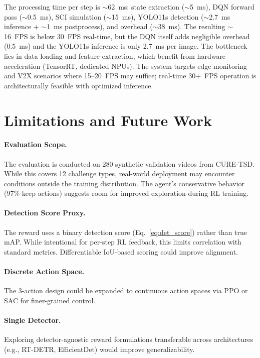 \documentclass[10pt,journal]{IEEEtran}
\begin{document}
The processing time per step is ${\sim}$62~ms: state extraction (${\sim}$5~ms), DQN forward pass (${\sim}$0.5~ms), SCI simulation (${\sim}$15~ms), YOLO11s detection (${\sim}$2.7~ms inference + ${\sim}$1~ms postprocess), and overhead (${\sim}$38~ms). The resulting ${\sim}$16~FPS is below 30~FPS real-time, but the DQN itself adds negligible overhead (0.5~ms) and the YOLO11s inference is only 2.7~ms per image. The bottleneck lies in data loading and feature extraction, which benefit from hardware acceleration (TensorRT, dedicated NPUs). The system targets edge monitoring and V2X scenarios where 15--20~FPS may suffice; real-time 30+~FPS operation is architecturally feasible with optimized inference.



\section{Limitations and Future Work}
\label{sec:limitations}

\paragraph{Evaluation Scope.}
The evaluation is conducted on 280 synthetic validation videos from CURE-TSD. While this covers 12 challenge types, real-world deployment may encounter conditions outside the training distribution. The agent's conservative behavior (97\% keep actions) suggests room for improved exploration during RL training.

\paragraph{Detection Score Proxy.}
The reward uses a binary detection score (Eq.~\ref{eq:det_score}) rather than true mAP. While intentional for per-step RL feedback, this limits correlation with standard metrics. Differentiable IoU-based scoring could improve alignment.

\paragraph{Discrete Action Space.}
The 3-action design could be expanded to continuous action spaces via PPO or SAC for finer-grained control.

\paragraph{Single Detector.}
Exploring detector-agnostic reward formulations transferable across architectures (e.g., RT-DETR, EfficientDet) would improve generalizability.
\end{document}
